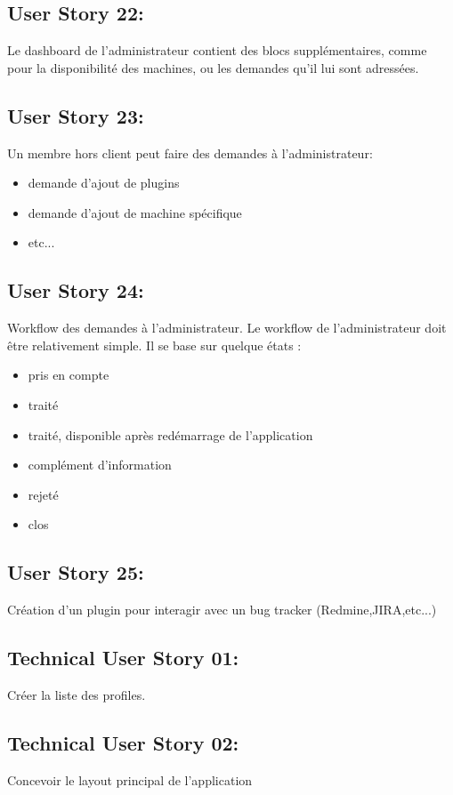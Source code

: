 	\subsection{User Story 22:}
	Le dashboard de l'administrateur contient des blocs supplémentaires, comme pour la disponibilité des machines,
	ou les demandes qu'il lui sont adressées.
		
	\subsection{User Story 23:}
	Un membre hors client peut faire des demandes à l'administrateur:
			\begin{itemize}
				\item demande d'ajout de plugins
				\item demande d'ajout de machine spécifique
				\item etc...
			\end{itemize}

	\subsection{User Story 24:}
	Workflow des demandes à l'administrateur.  Le workflow de l'administrateur doit être relativement
	simple. Il se base sur quelque états :
	
			\begin{itemize}
				\item pris en compte
				\item traité
				\item traité, disponible après redémarrage de l'application
				\item complément d'information
				\item rejeté
				\item clos
			\end{itemize}

	\subsection{User Story 25:}
	Création d'un plugin pour interagir avec un bug tracker (Redmine,JIRA,etc...)
	
	\subsection{Technical User Story 01:}
	Créer la liste des profiles.
	
	\subsection{Technical User Story 02:}
	Concevoir le layout principal de l'application
	
